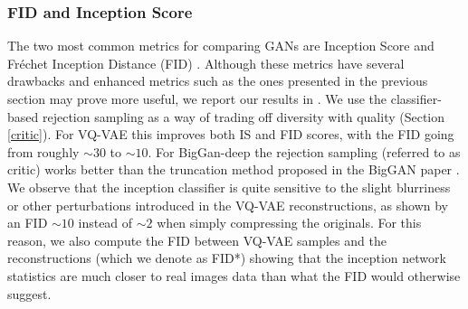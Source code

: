 \subsubsection{FID and Inception Score}\label{sec:fid}


The two most common metrics for comparing GANs are Inception Score \cite{IS} and Fr\'echet Inception Distance (FID) \cite{FID}. Although these metrics have several drawbacks \cite{barratt2018note, sajjadi2018assessing, NvidiaPR} and enhanced metrics such as the ones presented in the previous section may prove more useful, we report our results in . We use the classifier-based rejection sampling as a way of trading off diversity with quality (Section \ref{critic}). For VQ-VAE this improves both IS and FID scores, with the FID going from roughly $\sim30$ to $\sim10$. For BigGan-deep the rejection sampling (referred to as critic) works better than the truncation method proposed in the BigGAN paper \cite{biggan}. We observe that the inception classifier is quite sensitive to the slight blurriness or other perturbations introduced in the VQ-VAE reconstructions, as shown by an FID $\sim10$ instead of $\sim2$ when simply compressing the originals. For this reason, we also compute the FID between VQ-VAE samples and the reconstructions (which we denote as FID*) showing that the inception network statistics are much closer to real images data than what the FID would otherwise suggest.


